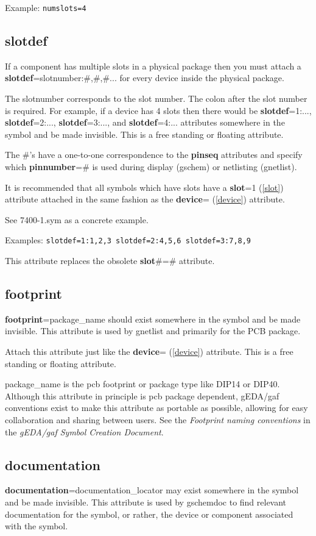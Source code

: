 \documentclass{article}
\begin{document}
Example: \texttt{numslots=4}


\subsection{\bf slotdef\label{slotdef}}
If a component has multiple slots in a physical package then you must 
attach a {\bf slotdef}=slotnumber:\#,\#,\#... for every device inside
the physical package.

The slotnumber corresponds to the slot number.  The colon after the
slot number is required.  For example, if a device has 4 slots then there
would be {\bf slotdef}=1:..., {\bf slotdef}=2:..., {\bf slotdef}=3:...,
and {\bf slotdef}=4:...  attributes somewhere in the symbol and be
made invisible.  This is a free standing or floating attribute.

The \#'s have a one-to-one correspondence to the {\bf pinseq} attributes
and specify which {\bf pinnumber}=\# is used during display (gschem)
or netlisting (gnetlist).

It is recommended that all symbols which have slots have a {\bf slot}=1
(\ref{slot}) attribute attached in the same fashion as the {\bf device}=
(\ref{device}) attribute.

See 7400-1.sym as a concrete example.

Examples: \texttt{slotdef=1:1,2,3 slotdef=2:4,5,6 slotdef=3:7,8,9}

This attribute replaces the obsolete {\bf slot}\#=\# attribute.


\subsection{\bf footprint\label{footprint}}
{\bf footprint}=package\_name should exist somewhere in the symbol and
be made invisible.  This attribute is used by gnetlist and primarily
for the PCB package.

Attach this attribute just like the {\bf device}= (\ref{device})
attribute.  This is a free standing or floating attribute.

package\_name is the pcb footprint or package type like DIP14 or DIP40.
Although this attribute in principle is pcb package dependent, 
gEDA/gaf conventions exist to make this attribute as portable as
possible, allowing for easy collaboration and sharing between users.
See the {\it Footprint naming conventions} in the
{\it gEDA/gaf Symbol Creation Document}.

\subsection{\bf documentation\label{documentation}}
{\bf documentation}=documentation\_locator may exist somewhere in the 
symbol and be made invisible.  This attribute is used by gschemdoc to 
find relevant documentation for the symbol, or rather, the device or 
component associated with the symbol.
\end{document}
